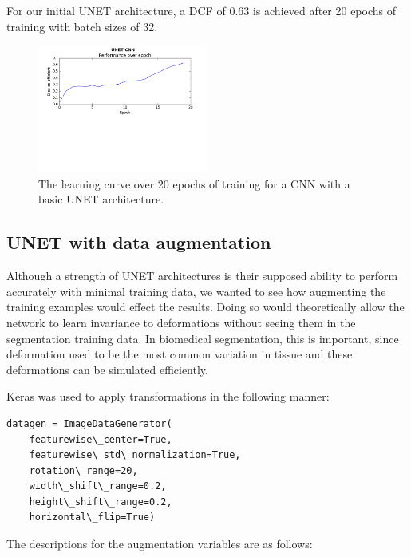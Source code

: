 \documentclass[letterpaper]{article}
\begin{document}
For our initial UNET architecture, a DCF of 0.63 is achieved after 20 epochs of training with batch sizes of 32. 

 \begin{figure}[H]
  \centerline{\includegraphics[width=0.5\textwidth]{Plots/UNETSimple20.png}}
  \caption{The learning curve over 20 epochs of training for a CNN with a basic UNET architecture.}
  \label{fig:unet3}
\end{figure}

\subsection{UNET with data augmentation}

Although a strength of UNET architectures is their supposed ability to perform accurately with minimal training data, we wanted to see how augmenting the training examples would effect the results. Doing so would theoretically allow the network to learn invariance to deformations without seeing them in the segmentation training data. In biomedical segmentation, this is important, since deformation used to be the most common variation in tissue and these deformations can be simulated efficiently. 

Keras was used to apply transformations in the following manner:

\begin{lstlisting}
datagen = ImageDataGenerator(
    featurewise\_center=True,
    featurewise\_std\_normalization=True,
    rotation\_range=20,
    width\_shift\_range=0.2,
    height\_shift\_range=0.2,
    horizontal\_flip=True)
\end{lstlisting}

The descriptions for the augmentation variables are as follows:
\end{document}
